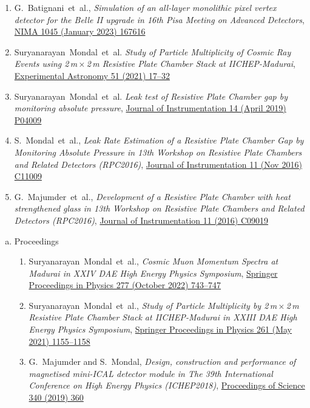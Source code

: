 \documentclass[12pt]{article}
\begin{document}
\begin{justify}
\begin{enumerate}[a.]
\begin{enumerate}[1.]
  \item G.~Batignani~et~al., \emph{Simulation of an all-layer monolithic pixel vertex detector for the Belle II upgrade in 16th Pisa Meeting on Advanced Detectors}, \href{https://doi.org/10.1016/j.nima.2022.167616}{NIMA 1045 (January 2023) 167616}
  \item Suryanarayan~Mondal~et~al. \emph{Study of Particle Multiplicity of Cosmic Ray Events using 2\,m\,$\times$\,2\,m Resistive Plate Chamber Stack at IICHEP-Madurai}, \href{https://doi.org/10.1007/s10686-020-09685-6}{Experimental Astronomy 51 (2021) 17--32}
  \item Suryanarayan~Mondal~et~al. \emph{Leak test of Resistive Plate Chamber gap by monitoring absolute pressure}, \href{https://doi.org/10.1088/1748-0221/14/04/P04009}{Journal of Instrumentation 14 (April 2019) P04009}
  \item S.~Mondal~et~al., \emph{Leak Rate Estimation of a Resistive Plate Chamber Gap by Monitoring Absolute Pressure in 13th Workshop on Resistive Plate Chambers and Related Detectors (RPC2016)}, \href{https://doi.org/10.1088/1748-0221/11/11/C11009}{Journal of Instrumentation 11 (Nov 2016) C11009}
  \item  G.~Majumder~et~al., \emph{Development of a Resistive Plate Chamber with heat strengthened glass in 13th Workshop on Resistive Plate Chambers and Related Detectors (RPC2016)}, \href{https://doi.org/10.1088/1748-0221/11/09/C09019}{Journal of Instrumentation 11 (2016) C09019}
  \end{enumerate} 
\end{enumerate} 
\begin{enumerate}[b.]
\item Proceedings
  \begin{enumerate}[1.]
  \item Suryanarayan~Mondal~et~al., \emph{Cosmic Muon Momentum Spectra at Madurai in XXIV DAE High Energy Physics Symposium}, \href{https://doi.org/10.1007/978-981-19-2354-8_134}{Springer Proceedings in Physics 277 (October 2022) 743--747}
  \item Suryanarayan~Mondal~et~al., \emph{Study of Particle Multiplicity by 2\,m\,$\times$\,2\,m Resistive Plate Chamber Stack at IICHEP-Madurai in XXIII DAE High Energy Physics Symposium}, \href{https://doi.org/10.1007/978-981-33-4408-2_172}{Springer Proceedings in Physics 261 (May 2021) 1155--1158}
  \item G.~Majumder and S.~Mondal, \emph{Design, construction and performance of magnetised mini-ICAL detector module in The 39th International Conference on High Energy Physics (ICHEP2018)}, \href{https://doi.org/10.22323/1.340.0360}{Proceedings of Science 340 (2019) 360}

\end{enumerate}
\end{enumerate}
\end{justify}
\end{document}
